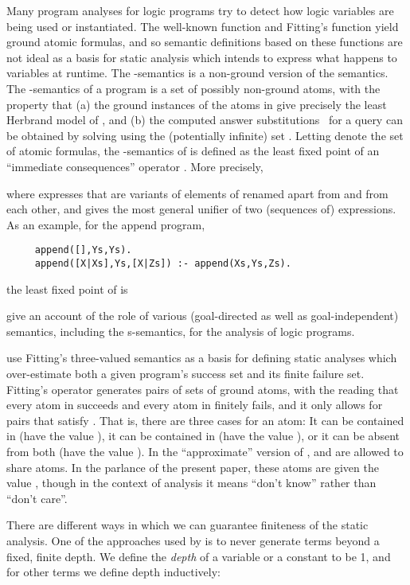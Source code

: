 \documentclass{tlp}
\begin{document}
Many program analyses for logic programs try to detect how logic
variables are being used or instantiated.
The well-known  function and Fitting's  function yield 
ground atomic formulas, and so semantic definitions based on these
functions are not ideal as a basis for static analysis which intends 
to express what happens to variables at runtime.
The -semantics \cite{Fal:ssem,Bossi:JLP94} 
is a non-ground version of the  semantics.
The -semantics of a program  is a set  of possibly
non-ground atoms, with the property that
(a) the ground instances of the atoms in  give precisely the least 
Herbrand model of , and 
(b) the computed answer substitutions~\cite{Llo84} for a query  can 
be obtained by solving  using the (potentially infinite) set .
Letting  denote the set of atomic formulas, the -semantics
of  is defined as the least fixed point of an ``immediate
consequences'' operator .
More precisely,

where  expresses that 
are variants of elements of  renamed apart from  and from
each other, and  gives the most general unifier of two
(sequences of) expressions.
As an example, for the append program,
\begin{verbatim}
     append([],Ys,Ys).
     append([X|Xs],Ys,[X|Zs]) :- append(Xs,Ys,Zs).
\end{verbatim}
the least fixed point of  is

 give an account of the role of various
(goal-directed as well as goal-independent) semantics,
including the s-semantics, for the analysis of logic programs.

 use Fitting's three-valued semantics as a basis
for defining static analyses which over-estimate both a given
program's success set and its finite failure set.
Fitting's  operator generates pairs  of
sets of ground atoms, with the reading that every atom in  succeeds
and every atom in  finitely fails, and it only allows for pairs
that satisfy .
That is, there are three cases for an atom: 
It can be contained in  (have the value ), it can be
contained in  (have the value ), or it can be
absent from both (have the value ).
In the ``approximate'' version of ,
 and  are allowed to share atoms.
In the parlance of the present paper, 
these atoms are given the value , though in the context of
analysis it means ``don't know'' rather than ``don't care''.

There are different ways in which we can guarantee finiteness of the
static analysis.
One of the approaches used by  is to never
generate terms beyond a fixed, finite depth.
We define the \emph{depth} of a variable or a constant to be 1,
and for other terms we define depth inductively:
\end{document}
